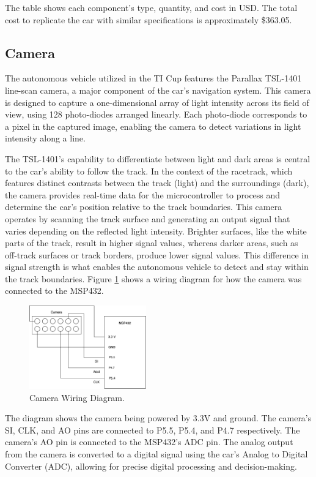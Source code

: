 \documentclass[conference]{IEEEtran}
\begin{document}
The table shows each component's type, quantity, and cost in USD. The total cost to replicate the car with similar specifications is approximately \$363.05.

\subsection{Camera}

The autonomous vehicle utilized in the TI Cup features the Parallax TSL-1401 line-scan camera, a major component of the car's navigation system. This camera is designed to capture a one-dimensional array of light intensity across its field of view, using 128 photo-diodes arranged linearly. Each photo-diode corresponds to a pixel in the captured image, enabling the camera to detect variations in light intensity along a line.

The TSL-1401's capability to differentiate between light and dark areas is central to the car's ability to follow the track. In the context of the racetrack, which features distinct contrasts between the track (light) and the surroundings (dark), the camera provides real-time data for the microcontroller to process and determine the car's position relative to the track boundaries. This camera operates by scanning the track surface and generating an output signal that varies depending on the reflected light intensity. Brighter surfaces, like the white parts of the track, result in higher signal values, whereas darker areas, such as off-track surfaces or track borders, produce lower signal values. This difference in signal strength is what enables the autonomous vehicle to detect and stay within the track boundaries. Figure \ref{fig:camera} shows a wiring diagram for how the camera was connected to the MSP432.

\begin{figure}[htbp]
	\centerline{\includegraphics[width=0.45\textwidth]{images/cameraWiring.png}}
	\caption{Camera Wiring Diagram.}
	\label{fig:camera}
\end{figure}

The diagram shows the camera being powered by 3.3V and ground. The camera's SI, CLK, and AO pins are connected to P5.5, P5.4, and P4.7 respectively. The camera's AO pin is connected to the MSP432's ADC pin. The analog output from the camera is converted to a digital signal using the car's Analog to Digital Converter (ADC), allowing for precise digital processing and decision-making.
\end{document}
